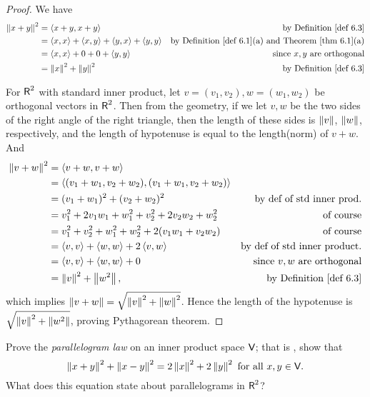 \begin{proof}
We have
\begin{align*}
    \norm{x + y}^2 & = \LG x + y, x + y \RG & \text{by \DEF{6.3}} \\
        & = \LG x, x \RG + \LG x, y \RG + \LG y, x \RG + \LG y, y \RG & \text{by \DEF{6.1}(a) and \THM{6.1}(a)} \\
        & = \LG x, x \RG + 0 + 0 + \LG y, y \RG & \text{since \(x, y\) are orthogonal} \\
        & = \norm{x}^2 + \norm{y}^2 & \text{by \DEF{6.3}}
\end{align*}

For \(\textsf{R}^2\) with standard inner product, let \(v = (v_1, v_2), w = (w_1, w_2)\) be orthogonal vectors in \(\textsf{R}^2\).
Then from the geometry, if we let \(v, w\) be the two sides of the right angle of the right triangle, then the length of these sides is \(\left\lVert v\right\rVert\), \(\left\lVert w\right\rVert\), respectively, and the length of hypotenuse is equal to the length(norm) of \(v + w\).
And
\begin{align*}
    \norm{v + w}^2 & = \LG v + w, v + w \RG \\
        & = \LG (v_1 + w_1, v_2 + w_2), (v_1 + w_1, v_2 + w_2) \RG \\
        & = (v_1 + w_1)^2 + (v_2 + w_2)^2 & \text{by def of std inner prod.} \\
        & = v_1^2 + 2v_1w_1 + w_1^2 + v_2^2 + 2v_2w_2 + w_2^2 & \text{of course} \\
        & = v_1^2 + v_2^2 + w_1^2 + w_2^2 + 2(v_1 w_1 + v_2 w_2) & \text{of course} \\
        & = \LG v, v \RG + \LG w, w \RG + 2 \LG v, w \RG & \text{by def of std inner product.} \\
        & = \LG v, v \RG + \LG w, w \RG + 0 & \text{since \(v, w\) are orthogonal} \\
        & = \norm{v}^2 + \norm{w^2}, & \text{by \DEF{6.3}}
\end{align*}
which implies \(\left\lVert v + w\right\rVert = \sqrt{\left\lVert v\right\rVert^2 + \left\lVert w\right\rVert^2}\).
Hence the length of the hypotenuse is \(\sqrt{\left\lVert v\right\rVert^2 + \left\lVert w^2\right\rVert}\), proving Pythagorean theorem.
\end{proof}

\begin{exercise} \label{exercise 6.1.11}
Prove the \emph{parallelogram law} on an inner product space \(\textsf{V}\); that is , show that
\[
    \left\lVert x + y\right\rVert^2 + \left\lVert x - y\right\rVert^2 = 2\left\lVert x\right\rVert^2 + 2\left\lVert y\right\rVert^2 \text{ for all } x, y \in \textsf{V}.
\]
What does this equation state about parallelograms in \(\textsf{R}^2\)?
\end{exercise}

